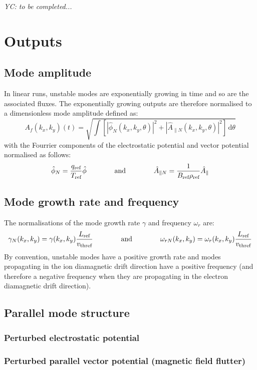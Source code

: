 \documentclass[fleqn]{report}
\begin{document}
\textit{YC: to be completed...}

\chapter{Outputs}
\section{Mode amplitude}
In linear runs, unstable modes are exponentially growing in time and so are the associated fluxes. 
The exponentially growing outputs are therefore normalised to a dimensionless mode amplitude defined as:
\begin{equation}
 A_f(k_x,k_y)(t) = \sqrt{\int \left[|\hat{\phi}_N(k_x,k_y,\theta)|^2 + |\hat{A}_{\parallel N}(k_x,k_y,\theta)|^2 \right] \,\textrm{d}\theta}
\end{equation}
with the Fourrier components of the electrostatic potential and vector potential normalised as follows:
\begin{equation}
  \hat{\phi}_N = \frac{q_{\textrm{ref}}}{T_{\textrm{ref}}} \hat{\phi} \qquad \qquad 
\textrm{and} \qquad \qquad \hat{A}_{\parallel N}=\frac{1}{B_{\textrm{ref}} \rho_{\textrm{ref}}} \hat{A}_\parallel
\end{equation}


\section{Mode growth rate and frequency}
The normalisations of the mode growth rate $\gamma$ and frequency $\omega_r$ are:
\begin{equation}
 \gamma_N(k_x,k_y) = \gamma(k_x,k_y) \frac{L_{\textrm{ref}}}{v_\textrm{thref}} \qquad \qquad \textrm{and} \qquad \qquad \omega_{rN}(k_x,k_y) = \omega_r(k_x,k_y) \frac{L_{\textrm{ref}}}{v_\textrm{thref}}
\end{equation}
By convention, unstable modes have a positive growth rate and modes propagating in the ion diamagnetic drift direction have a positive frequency (and therefore a negative frequency when they are propagating in the electron diamagnetic drift direction).

\section{Parallel mode structure}
\subsection{Perturbed electrostatic potential}
\subsection{Perturbed parallel vector potential (magnetic field flutter)}
\end{document}
